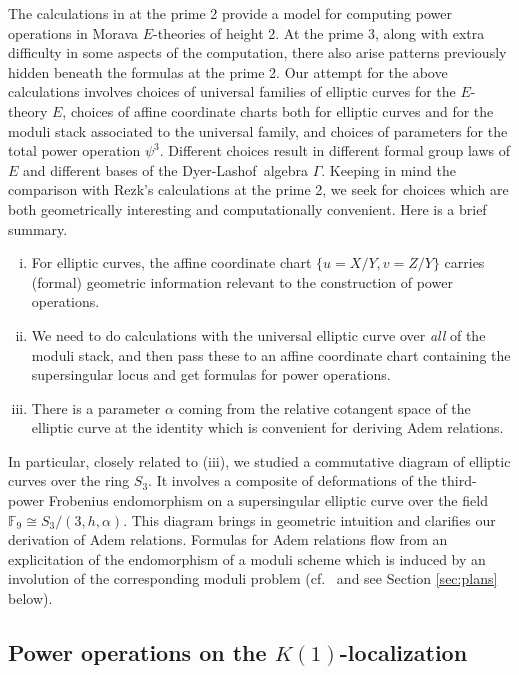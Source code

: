 \documentclass{rs}
\theoremstyle{definition}
\theoremstyle{remark}
\newcommand{\mb}[1]{\mathbb{#1}}
\newcommand{\DL}{Dyer-Lashof~}
\newcommand{\BF}{{\mb F}}
\newcommand{\A}{\alpha}
\newcommand{\G}{\Gamma}
\newcommand{\p}{\psi^3}
\begin{document}
The calculations in \cite{h2p2} at the prime 2 provide a model for computing power operations in Morava $E$-theories of height 2.  
At the prime 3, along with extra difficulty in some aspects of the computation, there also arise patterns previously hidden beneath the formulas at the prime 2.  
Our attempt for the above calculations involves choices of universal families of elliptic curves for the $E$-theory $E$, 
choices of affine coordinate charts both for elliptic curves and for the moduli stack associated to the universal family, 
and choices of parameters for the total power operation $\p$.  
Different choices result in different formal group laws of $E$ and different bases of the \DL algebra $\G$.  
Keeping in mind the comparison with Rezk's calculations at the prime 2, 
we seek for choices which are both geometrically interesting and computationally convenient.  
Here is a brief summary.  
\begin{enumerate}[(i)]
 \item For elliptic curves, the affine coordinate chart $\{u = X/Y, v = Z/Y\}$ 
 carries (formal) geometric information relevant to the construction of power operations.  

 \item We need to do calculations with the universal elliptic curve over {\em all} of the moduli stack, 
 and then pass these to an affine coordinate chart containing the supersingular locus 
 and get formulas for power operations.  

 \item \label{A} There is a parameter $\A$ coming from the relative cotangent space of the elliptic curve at the identity 
 which is convenient for deriving Adem relations.  
\end{enumerate}
In particular, closely related to (iii), we studied a commutative diagram of elliptic curves over the ring $S_3$.  
It involves a composite of deformations of the third-power Frobenius endomorphism 
on a supersingular elliptic curve over the field $\BF_9 \cong S_3 / (3,h,\A)$.  
This diagram brings in geometric intuition and clarifies our derivation of Adem relations.  
Formulas for Adem relations flow from an explicitation of the endomorphism of a moduli scheme 
which is induced by an involution of the corresponding moduli problem (cf.~\cite[11.3.1]{KM} and see Section \ref{sec:plans} below).  


\subsection{Power operations on the $K(1)$-localization}
\end{document}
